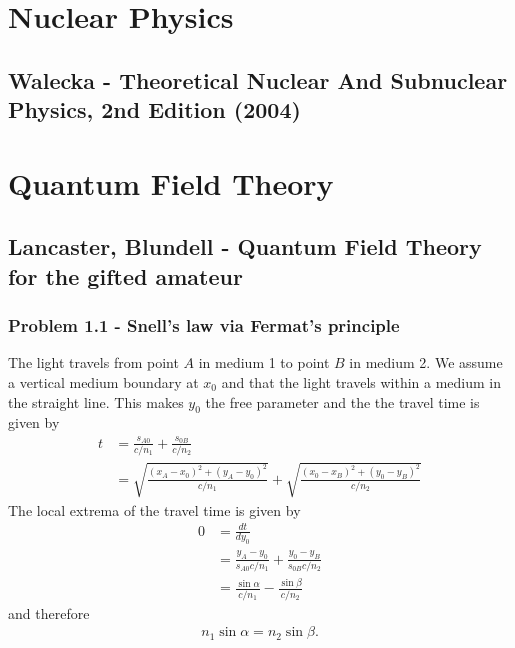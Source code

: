 \documentclass[10pt,a4paper]{book}
\theoremstyle{definition}
\begin{document}
\chapter{Nuclear Physics}
\section{{\sc Walecka} - Theoretical Nuclear And Subnuclear Physics, 2nd Edition (2004)}



\chapter{Quantum Field Theory}
\section{{\sc Lancaster, Blundell} - Quantum Field Theory for the gifted amateur}
\subsection{Problem 1.1 - Snell's law via Fermat's principle}
The light travels from point $A$ in medium 1 to point $B$ in medium 2. We assume a vertical medium boundary at $x_0$ and that the light travels within a medium in the straight line. This makes $y_0$ the free parameter and the the travel time is given by
\begin{align}
    t&=\frac{s_{A0}}{c/n_1}+\frac{s_{0B}}{c/n_2}\\
    &=\sqrt{\frac{(x_A-x_0)^2+(y_A-y_0)^2}{c/n_1}}+\sqrt{\frac{(x_0-x_B)^2+(y_0-y_B)^2}{c/n_2}}
\end{align}
The local extrema of the travel time is given by
\begin{align}
    0&=\frac{dt}{dy_0}\\
    &=\frac{y_A-y_0}{s_{A0}c/n_1}+\frac{y_0-y_B}{s_{0B}c/n_2}\\
    &=\frac{\sin\alpha}{c/n_1}-\frac{\sin\beta}{c/n_2}
\end{align}
and therefore
\begin{align}
n_1\sin\alpha=n_2\sin\beta.
\end{align}
\end{document}
